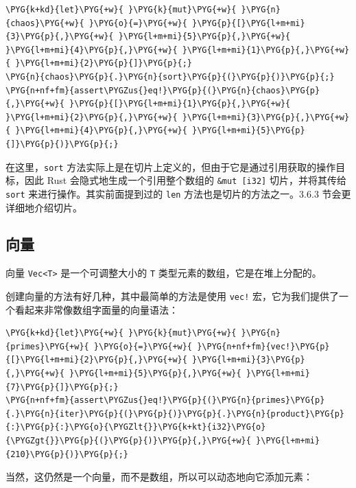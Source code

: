 \begin{Verbatim}[commandchars=\\\{\},breaklines=true,breakanywhere=true,fontsize=\codefont,xleftmargin=17bp]
\PYG{k+kd}{let}\PYG{+w}{ }\PYG{k}{mut}\PYG{+w}{ }\PYG{n}{chaos}\PYG{+w}{ }\PYG{o}{=}\PYG{+w}{ }\PYG{p}{[}\PYG{l+m+mi}{3}\PYG{p}{,}\PYG{+w}{ }\PYG{l+m+mi}{5}\PYG{p}{,}\PYG{+w}{ }\PYG{l+m+mi}{4}\PYG{p}{,}\PYG{+w}{ }\PYG{l+m+mi}{1}\PYG{p}{,}\PYG{+w}{ }\PYG{l+m+mi}{2}\PYG{p}{]}\PYG{p}{;}
\PYG{n}{chaos}\PYG{p}{.}\PYG{n}{sort}\PYG{p}{(}\PYG{p}{)}\PYG{p}{;}
\PYG{n+nf+fm}{assert\PYGZus{}eq!}\PYG{p}{(}\PYG{n}{chaos}\PYG{p}{,}\PYG{+w}{ }\PYG{p}{[}\PYG{l+m+mi}{1}\PYG{p}{,}\PYG{+w}{ }\PYG{l+m+mi}{2}\PYG{p}{,}\PYG{+w}{ }\PYG{l+m+mi}{3}\PYG{p}{,}\PYG{+w}{ }\PYG{l+m+mi}{4}\PYG{p}{,}\PYG{+w}{ }\PYG{l+m+mi}{5}\PYG{p}{]}\PYG{p}{)}\PYG{p}{;}
\end{Verbatim}

在这里，\texttt{sort} 方法实际上是在切片上定义的，但由于它是通过引用获取的操作目标，因此 Rust 会隐式地生成一个引用整个数组的 \texttt{\&mut [i32]} 切片，并将其传给 \texttt{sort} 来进行操作。其实前面提到过的 \texttt{len} 方法也是切片的方法之一。3.6.3 节会更详细地介绍切片。

\subsection{向量}

向量 \texttt{Vec<T>} 是一个可调整大小的 \texttt{T} 类型元素的数组，它是在堆上分配的。

创建向量的方法有好几种，其中最简单的方法是使用 \texttt{vec!} 宏，它为我们提供了一个看起来非常像数组字面量的向量语法：

\begin{Verbatim}[commandchars=\\\{\},breaklines=true,breakanywhere=true,fontsize=\codefont,xleftmargin=17bp]
\PYG{k+kd}{let}\PYG{+w}{ }\PYG{k}{mut}\PYG{+w}{ }\PYG{n}{primes}\PYG{+w}{ }\PYG{o}{=}\PYG{+w}{ }\PYG{n+nf+fm}{vec!}\PYG{p}{[}\PYG{l+m+mi}{2}\PYG{p}{,}\PYG{+w}{ }\PYG{l+m+mi}{3}\PYG{p}{,}\PYG{+w}{ }\PYG{l+m+mi}{5}\PYG{p}{,}\PYG{+w}{ }\PYG{l+m+mi}{7}\PYG{p}{]}\PYG{p}{;}
\PYG{n+nf+fm}{assert\PYGZus{}eq!}\PYG{p}{(}\PYG{n}{primes}\PYG{p}{.}\PYG{n}{iter}\PYG{p}{(}\PYG{p}{)}\PYG{p}{.}\PYG{n}{product}\PYG{p}{:}\PYG{p}{:}\PYG{o}{\PYGZlt{}}\PYG{k+kt}{i32}\PYG{o}{\PYGZgt{}}\PYG{p}{(}\PYG{p}{)}\PYG{p}{,}\PYG{+w}{ }\PYG{l+m+mi}{210}\PYG{p}{)}\PYG{p}{;}
\end{Verbatim}

当然，这仍然是一个向量，而不是数组，所以可以动态地向它添加元素：

